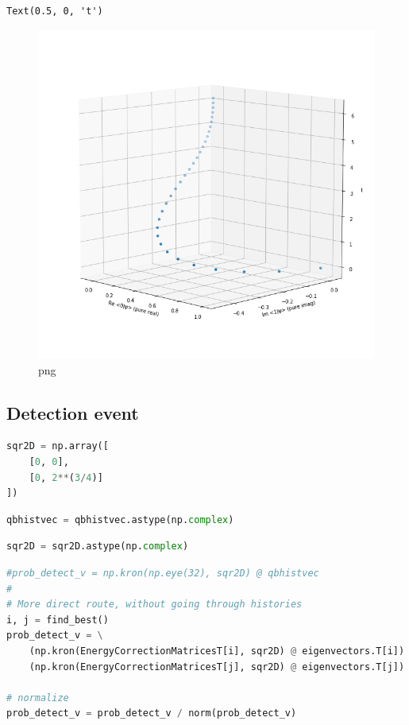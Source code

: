 \begin{lstlisting}
Text(0.5, 0, 't')
\end{lstlisting}

\begin{figure}
\centering
\includegraphics[width=0.66\linewidth]{output_85_1.png}
\caption[]{png}
\end{figure}

\hypertarget{detection-event}{%
\subsection{Detection event}\label{detection-event}}

\begin{lstlisting}[language=Python]
sqr2D = np.array([
    [0, 0],
    [0, 2**(3/4)]
])
\end{lstlisting}

\begin{lstlisting}[language=Python]
qbhistvec = qbhistvec.astype(np.complex)
\end{lstlisting}

\begin{lstlisting}[language=Python]
sqr2D = sqr2D.astype(np.complex)
\end{lstlisting}

\begin{lstlisting}[language=Python]
#prob_detect_v = np.kron(np.eye(32), sqr2D) @ qbhistvec
#
# More direct route, without going through histories
i, j = find_best()
prob_detect_v = \
    (np.kron(EnergyCorrectionMatricesT[i], sqr2D) @ eigenvectors.T[i]) + \
    (np.kron(EnergyCorrectionMatricesT[j], sqr2D) @ eigenvectors.T[j])

# normalize
prob_detect_v = prob_detect_v / norm(prob_detect_v)

\end{lstlisting}


